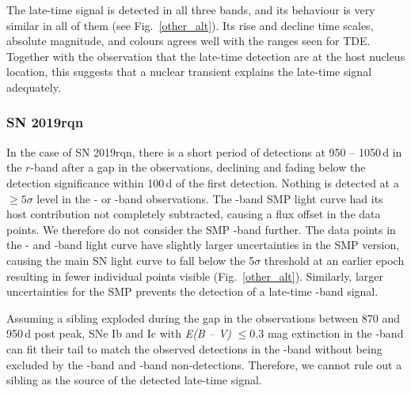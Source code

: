 \documentclass[a4paper,oneside,12pt, class=Latex/Classes/PhDthesisPSnPDF, crop=false]{standalone}
\begin{document}
The late-time signal is detected in all three bands, and its behaviour is very similar in all of them (see Fig.~\ref{other_alt}). Its rise and decline time scales, absolute magnitude, and colours agrees well with the ranges seen for TDE. Together with the observation that the late-time detection are at the host nucleus location, this suggests that a nuclear transient explains the late-time signal adequately.

\subsubsection*{SN 2019rqn}
In the case of SN 2019rqn, there is a short period of detections at 950 -- 1050\,d in the $r$-band after a gap in the observations, declining and fading below the detection significance within 100\,d of the first detection. Nothing is detected at a $\geq 5 \sigma$ level in the \ztfg- or \ztfi-band observations. The \ztfi-band SMP light curve had its host contribution not completely subtracted, causing a flux offset in the data points. We therefore do not consider the SMP \ztfi-band further. The data points in the \ztfg- and \ztfr-band light curve have slightly larger uncertainties in the SMP version, causing the main SN light curve to fall below the 5$\sigma$ threshold at an earlier epoch resulting in fewer individual points visible (Fig.~\ref{other_alt}). Similarly, larger uncertainties for the SMP prevents the detection of a late-time \ztfr-band signal.

Assuming a sibling exploded during the gap in the observations between 870 and 950\,d post peak, SNe Ib and Ic with \textit{E(B -- V)} $\leq 0.3$ mag extinction in the \ztfr-band can fit their tail to match the observed detections in the \ztfr-band without being excluded by the \ztfg-band and \ztfi-band non-detections. Therefore, we cannot rule out a sibling as the source of the detected late-time signal.
\end{document}
